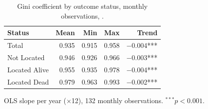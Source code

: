 \begin{table}[htbp]
\centering
\caption{Gini coefficient by outcome status, \nmonths{} monthly observations, \studyperiod{}.}\label{tab:concentration}
\begin{tabular}{lrrrr}
  \toprule
  \textbf{Status} & \textbf{Mean} & \textbf{Min} & \textbf{Max} & \textbf{Trend}\tnote{a} \\
  \midrule
  Total         & 0.935 & 0.915 & 0.958 & $-$0.004*** \\
  Not Located   & 0.946 & 0.926 & 0.966 & $-$0.003*** \\
  Located Alive & 0.955 & 0.935 & 0.978 & $-$0.004*** \\
  Located Dead  & 0.979 & 0.963 & 0.993 & $-$0.002*** \\
  \bottomrule
\end{tabular}
\begin{tablenotes}
\small
\item[a] OLS slope per year ($\times$12), 132 monthly observations. $^{***}p<0.001$.
\end{tablenotes}
\end{table}